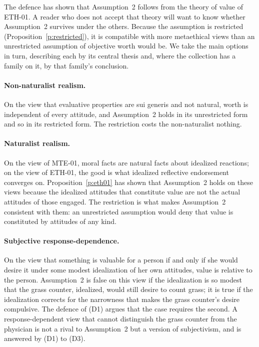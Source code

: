 The defence has shown that Assumption~2 follows from the theory of value of ETH-01. A reader who does not accept that theory will want to know whether Assumption~2 survives under the others. Because the assumption is restricted (Proposition~\ref{p:restricted}), it is compatible with more metaethical views than an unrestricted assumption of objective worth would be. We take the main options in turn, describing each by its central thesis and, where the collection has a family on it, by that family's conclusion.

\paragraph{Non-naturalist realism.} On the view that evaluative properties are sui generis and not natural, worth is independent of every attitude, and Assumption~2 holds in its unrestricted form and so in its restricted form. The restriction costs the non-naturalist nothing.

\paragraph{Naturalist realism.} On the view of MTE-01, moral facts are natural facts about idealized reactions; on the view of ETH-01, the good is what idealized reflective endorsement converges on. Proposition~\ref{p:eth01} has shown that Assumption~2 holds on these views because the idealized attitudes that constitute value are not the actual attitudes of those engaged. The restriction is what makes Assumption~2 consistent with them: an unrestricted assumption would deny that value is constituted by attitudes of any kind.

\paragraph{Subjective response-dependence.} On the view that something is valuable for a person if and only if she would desire it under some modest idealization of her own attitudes, value is relative to the person. Assumption~2 is false on this view if the idealization is so modest that the grass counter, idealized, would still desire to count grass; it is true if the idealization corrects for the narrowness that makes the grass counter's desire compulsive. The defence of (D1) argues that the case requires the second. A response-dependent view that cannot distinguish the grass counter from the physician is not a rival to Assumption~2 but a version of subjectivism, and is answered by (D1) to (D3).

